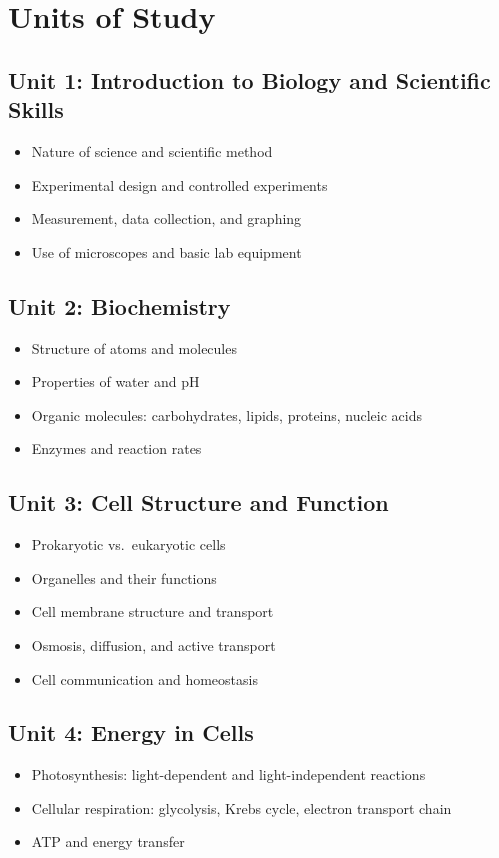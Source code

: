 \documentclass[12pt,oneside]{book}
\begin{document}
\section{Units of Study}
\subsection*{Unit 1: Introduction to Biology and Scientific Skills}
\begin{itemize}[leftmargin=2em]
    \item Nature of science and scientific method
    \item Experimental design and controlled experiments
    \item Measurement, data collection, and graphing
    \item Use of microscopes and basic lab equipment
\end{itemize}

\subsection*{Unit 2: Biochemistry}
\begin{itemize}[leftmargin=2em]
    \item Structure of atoms and molecules
    \item Properties of water and pH
    \item Organic molecules: carbohydrates, lipids, proteins, nucleic acids
    \item Enzymes and reaction rates
\end{itemize}

\subsection*{Unit 3: Cell Structure and Function}
\begin{itemize}[leftmargin=2em]
    \item Prokaryotic vs.\ eukaryotic cells
    \item Organelles and their functions
    \item Cell membrane structure and transport
    \item Osmosis, diffusion, and active transport
    \item Cell communication and homeostasis
\end{itemize}

\subsection*{Unit 4: Energy in Cells}
\begin{itemize}[leftmargin=2em]
    \item Photosynthesis: light-dependent and light-independent reactions
    \item Cellular respiration: glycolysis, Krebs cycle, electron transport chain
    \item ATP and energy transfer
\end{itemize}
\end{document}

